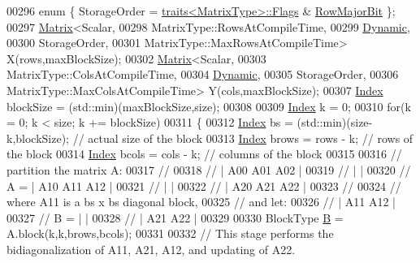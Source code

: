 \begin{DoxyCode}
00296   \textcolor{keyword}{enum} \{ StorageOrder = \hyperlink{struct_eigen_1_1internal_1_1traits}{traits<MatrixType>::Flags} & 
      \hyperlink{group__flags_gae4f56c2a60bbe4bd2e44c5b19cbe8762}{RowMajorBit} \};
00297   \hyperlink{group___core___module_class_eigen_1_1_matrix}{Matrix}<Scalar,
00298          MatrixType::RowsAtCompileTime,
00299          \hyperlink{namespace_eigen_ad81fa7195215a0ce30017dfac309f0b2}{Dynamic},
00300          StorageOrder,
00301          MatrixType::MaxRowsAtCompileTime> X(rows,maxBlockSize);
00302   \hyperlink{group___core___module_class_eigen_1_1_matrix}{Matrix}<Scalar,
00303          MatrixType::ColsAtCompileTime,
00304          \hyperlink{namespace_eigen_ad81fa7195215a0ce30017dfac309f0b2}{Dynamic},
00305          StorageOrder,
00306          MatrixType::MaxColsAtCompileTime> Y(cols,maxBlockSize);
00307   \hyperlink{class_eigen_1_1internal_1_1_upper_bidiagonalization_adcb14f3919a3dcc9977ba6b8105087fe}{Index} blockSize = (std::min)(maxBlockSize,size);
00308 
00309   \hyperlink{class_eigen_1_1internal_1_1_upper_bidiagonalization_adcb14f3919a3dcc9977ba6b8105087fe}{Index} k = 0;
00310   \textcolor{keywordflow}{for}(k = 0; k < size; k += blockSize)
00311   \{
00312     \hyperlink{class_eigen_1_1internal_1_1_upper_bidiagonalization_adcb14f3919a3dcc9977ba6b8105087fe}{Index} bs = (std::min)(size-k,blockSize);  \textcolor{comment}{// actual size of the block}
00313     \hyperlink{class_eigen_1_1internal_1_1_upper_bidiagonalization_adcb14f3919a3dcc9977ba6b8105087fe}{Index} brows = rows - k;                   \textcolor{comment}{// rows of the block}
00314     \hyperlink{class_eigen_1_1internal_1_1_upper_bidiagonalization_adcb14f3919a3dcc9977ba6b8105087fe}{Index} bcols = cols - k;                   \textcolor{comment}{// columns of the block}
00315 
00316     \textcolor{comment}{// partition the matrix A:}
00317     \textcolor{comment}{// }
00318     \textcolor{comment}{//      | A00 A01 A02 |}
00319     \textcolor{comment}{//      |             |}
00320     \textcolor{comment}{// A  = | A10 A11 A12 |}
00321     \textcolor{comment}{//      |             |}
00322     \textcolor{comment}{//      | A20 A21 A22 |}
00323     \textcolor{comment}{//}
00324     \textcolor{comment}{// where A11 is a bs x bs diagonal block,}
00325     \textcolor{comment}{// and let:}
00326     \textcolor{comment}{//      | A11 A12 |}
00327     \textcolor{comment}{//  B = |         |}
00328     \textcolor{comment}{//      | A21 A22 |}
00329 
00330     BlockType \hyperlink{group___core___module_class_eigen_1_1_matrix}{B} = A.block(k,k,brows,bcols);
00331     
00332     \textcolor{comment}{// This stage performs the bidiagonalization of A11, A21, A12, and updating of A22.}

\end{DoxyCode}

